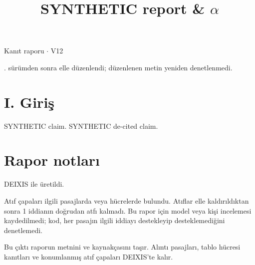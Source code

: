 \documentclass[journal]{IEEEtran}
\begin{document}
\renewcommand{\abstractname}{Özet}
\renewcommand{\IEEEkeywordsname}{Dizin Terimleri}
\renewcommand{\refname}{Kaynaklar}

\title{SYNTHETIC report \& \ensuremath{\alpha}}

\maketitle

\noindent Kanıt raporu \ensuremath{\cdot} V12

. sürümden sonra elle düzenlendi; düzenlenen metin yeniden denetlenmedi.

\section*{I. Giriş}

SYNTHETIC claim. \cite{Synth26} SYNTHETIC de-cited claim.

\section*{Rapor notları}

DEIXIS ile üretildi.

Atıf çapaları ilgili pasajlarda veya hücrelerde bulundu. Atıflar elle kaldırıldıktan sonra 1 iddianın doğrudan atfı kalmadı. Bu rapor için model veya kişi incelemesi kaydedilmedi; kod, her pasajın ilgili iddiayı destekleyip desteklemediğini denetlemedi.

Bu çıktı raporun metnini ve kaynakçasını taşır. Alıntı pasajları, tablo hücresi kanıtları ve konumlanmış atıf çapaları DEIXIS'te kalır.




\end{document}

